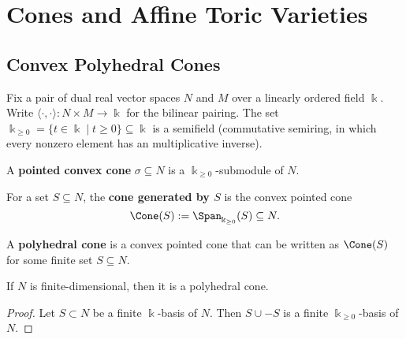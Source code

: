 \section{Cones and Affine Toric Varieties}

\subsection{Convex Polyhedral Cones}

Fix a pair of dual real vector spaces \( N \) and \( M \) over a
linearly ordered field \( \Bbbk \). Write \( \langle \cdot, \cdot
\rangle \colon N \times M \to \Bbbk \) for the bilinear pairing. The
set \(\Bbbk_{\geq 0} = \{t \in \Bbbk \mid t \geq 0 \} \subseteq \Bbbk\)
is a semifield (commutative semiring, in which every nonzero element
has an multiplicative inverse).

\begin{definition}
  \label{1-2-pointed-cone}
  \uses{}
  \leanok

  A {\bf pointed convex cone} \( \sigma \subseteq N \) is a \( \Bbbk_{\geq 0}
  \)-submodule of \( N \).
\end{definition}

\begin{definition}
  \label{1-2-cone-hull}
  \leanok
  For a set \( S \subseteq N \), the {\bf cone generated by \( S \)}
  is the convex pointed cone
  \[
      \Cone(S) := \Span_{\Bbbk_{\geq 0}}(S) \subseteq N.
  \]
\end{definition}

\begin{definition}
  \label{1-2-1-polyhedral-cone}
  \leanok
  A {\bf polyhedral cone} is a convex pointed cone that can be
  written as \( \Cone(S) \) for some finite set \( S \subseteq N \).
\end{definition}

\begin{proposition}
  \label{1-2-1-top-polyhedral}
  \leanok
  If \( N \) is finite-dimensional, then it is a polyhedral cone.
\end{proposition}
\begin{proof}
  \uses{}
  \leanok
  Let \( S \subset N \) be a finite \( \Bbbk \)-basis of \( N \). Then \( S
  \cup -S \) is a finite \( \Bbbk_{\geq 0} \)-basis of \( N \).
\end{proof}

